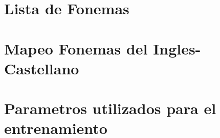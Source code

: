 \section{Lista de Fonemas}

\section{Mapeo Fonemas del Ingles-Castellano}

\section{Parametros utilizados para el entrenamiento}

